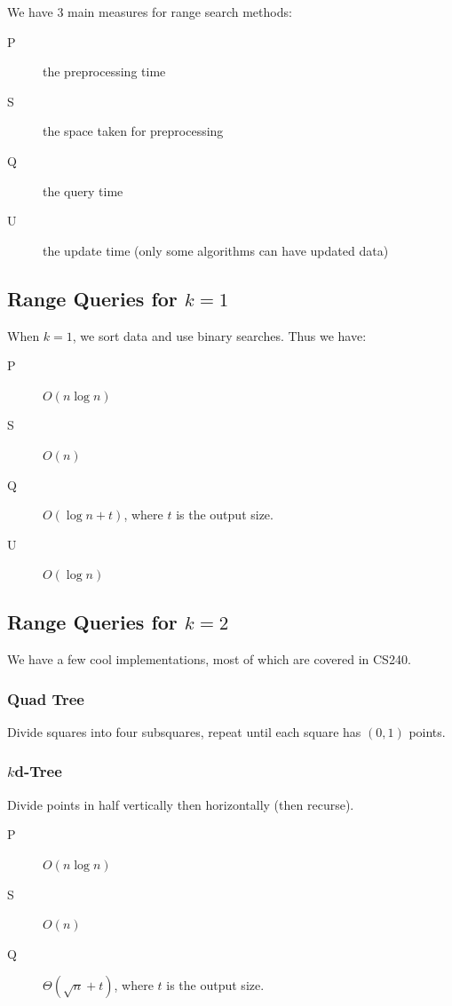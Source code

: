                 We have 3 main measures for range search methods:
                \begin{description}
                    \item[P] the preprocessing time
                    \item[S] the space taken for preprocessing
                    \item[Q] the query time
                    \item[U] the update time (only some algorithms can have updated data)
                \end{description}
                \subsection{Range Queries for $k=1$} %
                \label{sub:range_queries_for_k_1}
                    When $k=1$, we sort data and use binary searches.
                    Thus we have:
                    \begin{description}
                        \item[P] $O(n \log n)$
                        \item[S] $O(n)$
                        \item[Q] $O(\log n + t)$, where $t$ is the output size.
                        \item[U] $O(\log n)$
                    \end{description}
                \subsection{Range Queries for $k=2$} %
                \label{sub:range_queries_for_k_2}
                    We have a few cool implementations, most of which are covered in CS240.

                    \subsubsection{Quad Tree} %
                    \label{ssub:quad_tree}
                        Divide squares into four subsquares, repeat until each square has $(0, 1)$ points.
                    \subsubsection{$k$d-Tree} %
                    \label{ssub:kd_tree}
                        Divide points in half vertically then horizontally (then recurse).
                        \begin{description}
                            \item[P] $O(n \log n)$
                            \item[S] $O(n)$
                            \item[Q] $\Theta(\sqrt{n} + t)$, where $t$ is the output size.
                        \end{description}
